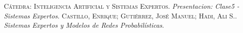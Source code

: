 \documentclass{article}
\begin{document}
\newpage
\begin{thebibliography}{99}
	\textsc{C\'atedra: Inteligencia Artificial y Sistemas Expertos}.
\textit{Presentacion: Clase5 - Sistemas Expertos}.
	\textsc{Castillo, Enrique;
Guti\'errez, Jos\'e Manuel; Hadi, Ali S.}. \textit{Sistemas Expertos y Modelos
de Redes Probabil\'isticas}.
\end{thebibliography}
\end{document}
